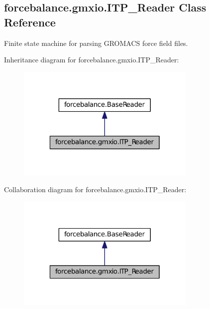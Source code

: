 \hypertarget{classforcebalance_1_1gmxio_1_1ITP__Reader}{\subsection{forcebalance.\-gmxio.\-I\-T\-P\-\_\-\-Reader \-Class \-Reference}
\label{classforcebalance_1_1gmxio_1_1ITP__Reader}
}


\-Finite state machine for parsing \-G\-R\-O\-M\-A\-C\-S force field files.  




\-Inheritance diagram for forcebalance.\-gmxio.\-I\-T\-P\-\_\-\-Reader\-:\nopagebreak
\begin{figure}[H]
\begin{center}
\leavevmode
\includegraphics[width=244pt]{classforcebalance_1_1gmxio_1_1ITP__Reader__inherit__graph}
\end{center}
\end{figure}


\-Collaboration diagram for forcebalance.\-gmxio.\-I\-T\-P\-\_\-\-Reader\-:\nopagebreak
\begin{figure}[H]
\begin{center}
\leavevmode
\includegraphics[width=244pt]{classforcebalance_1_1gmxio_1_1ITP__Reader__coll__graph}
\end{center}
\end{figure}
